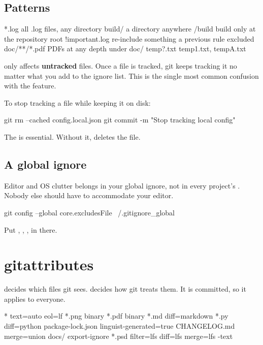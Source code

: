 \documentclass[11pt]{article}
\begin{document}
\subsection{Patterns}

\begin{terminal}
*.log              all .log files, any directory
build/             a directory anywhere
/build             build only at the repository root
!important.log     re-include something a previous rule excluded
doc/**/*.pdf       PDFs at any depth under doc/
temp?.txt          temp1.txt, tempA.txt
\end{terminal}

\begin{trap}
 only affects \textbf{untracked} files. Once a file is tracked, git
keeps tracking it no matter what you add to the ignore list. This is the single most
common confusion with the feature.

To stop tracking a file while keeping it on disk:

\begin{shell}
git rm --cached config.local.json
git commit -m "Stop tracking local config"
\end{shell}

The  is essential. Without it,  deletes the file.
\end{trap}

\subsection{A global ignore}

Editor and OS clutter belongs in your global ignore, not in every project's
. Nobody else should have to accommodate your editor.

\begin{shell}
git config --global core.excludesFile ~/.gitignore_global
\end{shell}

Put , , ,  in there.

\section{gitattributes}

 decides which files git sees.  decides how git
treats them. It is committed, so it applies to everyone.

\begin{terminal}
* text=auto eol=lf
*.png binary
*.pdf binary
*.md diff=markdown
*.py diff=python
package-lock.json linguist-generated=true
CHANGELOG.md merge=union
docs/ export-ignore
*.psd filter=lfs diff=lfs merge=lfs -text
\end{terminal}
\end{document}
